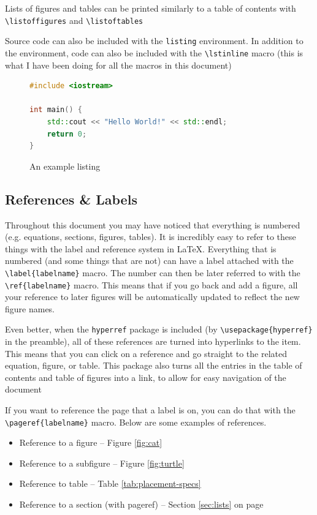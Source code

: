 \documentclass[11pt, twoside]{article}
\begin{document}
Lists of figures and tables can be printed similarly to a table of contents with \lstinline{\listoffigures} and  \lstinline{\listoftables}

Source code can also be included with the \lstinline{listing} environment. In addition to the environment, code can also be included with the \lstinline{\lstinline} macro (this is what I have been doing for all the macros in this document)

\begin{figure}
    \caption{An example listing}
    \begin{lstlisting}[language=c++,keywordstyle=\color{blue}]
#include <iostream>

int main() {
    std::cout << "Hello World!" << std::endl;
    return 0;
}
			\end{lstlisting}
\end{figure}

\subsection{References \& Labels}
Throughout this document you may have noticed that everything is numbered (e.g. equations, sections, figures, tables). It is incredibly easy to refer to these things with the label and reference system in \LaTeX{}. Everything that is numbered (and some things that are not) can have a label attached with the \lstinline|\label{labelname}| macro. The number can then be later referred to with the \lstinline|\ref{labelname}| macro. This means that if you go back and add a figure, all your reference to later figures will be automatically updated to reflect the new figure names.

Even better, when the \lstinline{hyperref} package is included (by \lstinline|\usepackage{hyperref}| in the preamble), all of these references are turned into hyperlinks to the item. This means that you can click on a reference and go straight to the related equation, figure, or table. This package also turns all the entries in the table of contents and table of figures into a link, to allow for easy navigation of the document

If you want to reference the page that a label is on, you can do that with the \lstinline|\pageref{labelname}| macro.
Below are some examples of references.
\begin{itemize}
    \item Reference to a figure -- Figure \ref{fig:cat}
    \item Reference to a subfigure -- Figure \ref{fig:turtle}
    \item Reference to table -- Table \ref{tab:placement-specs}
    \item Reference to a section (with pageref) -- Section \ref{sec:lists} on page \pageref{sec:lists}
\end{itemize}
\end{document}
